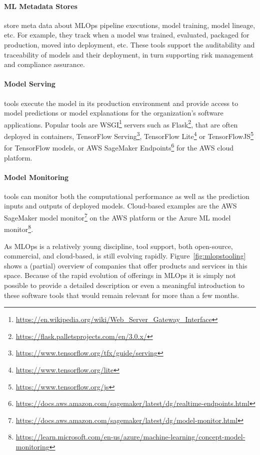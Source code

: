 \paragraph*{ML Metadata Stores} store meta data about MLOps pipeline executions, model training, model lineage, etc. For example, they track when a model was trained, evaluated, packaged for production, moved into deployment, etc. These tools support the auditability and traceability of models and their deployment, in turn supporting risk management and compliance assurance.

\paragraph*{Model Serving} tools execute the model in its production environment and provide access to model predictions or model explanations for the organization's software applications. Popular tools are WSGI\footnote{\url{https://en.wikipedia.org/wiki/Web_Server_Gateway_Interface}} servers such as Flask\footnote{\url{https://flask.palletsprojects.com/en/3.0.x/}}, that are often deployed in containers, TensorFlow Serving\footnote{\url{https://www.tensorflow.org/tfx/guide/serving}}, TensorFlow Lite\footnote{\url{https://www.tensorflow.org/lite}} or TensorFlowJS\footnote{\url{https://www.tensorflow.org/js}} for TensorFlow models, or AWS SageMaker Endpoints\footnote{\url{https://docs.aws.amazon.com/sagemaker/latest/dg/realtime-endpoints.html}} for the AWS cloud platform. 

\paragraph*{Model Monitoring} tools can monitor both the computational performance as well as the prediction inputs and outputs of deployed models. Cloud-based examples are the AWS SageMaker model monitor\footnote{\url{https://docs.aws.amazon.com/sagemaker/latest/dg/model-monitor.html}} on the AWS platform or the Azure ML model monitor\footnote{\url{https://learn.microsoft.com/en-us/azure/machine-learning/concept-model-monitoring}}. 

As MLOps is a relatively young discipline, tool support, both open-source, commercial, and cloud-based, is still evolving rapidly. Figure~\ref{fig:mlopstooling} shows a (partial) overview of companies that offer products and services in this space. Because of the rapid evolution of offerings in MLOps it is simply not possible to provide a detailed description or even a meaningful introduction to these software tools that would remain relevant for more than a few months. 

